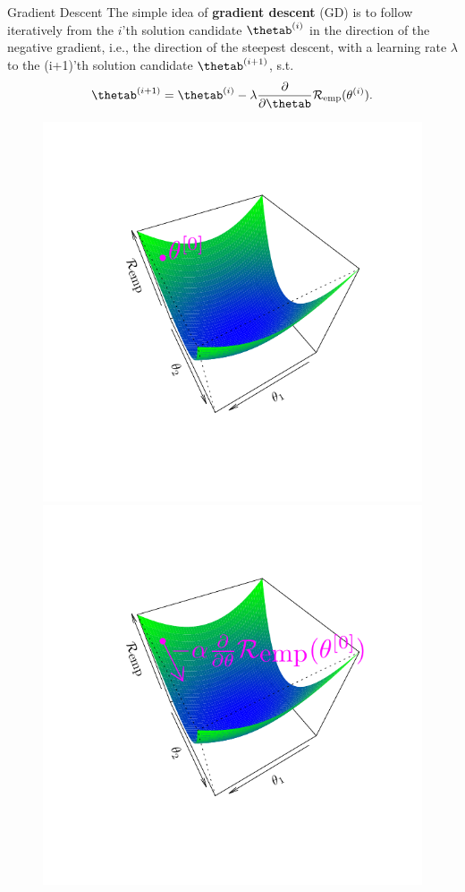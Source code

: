 \documentclass[11pt,compress,t,notes=noshow, xcolor=table]{beamer}
\begin{document}
\begin{vbframe}{Gradient Descent}
The simple idea of \textbf{gradient descent} (GD) is to follow iteratively from the $i$'th solution candidate $\thetab^{(i)}$ in the direction of the negative gradient, i.e., the direction of the steepest descent, with a learning rate $\lambda$ to the (i+1)'th solution candidate $\thetab^{(i+1)}$, s.t.
\[
\thetab^{(i+1)} = \thetab^{(i)} - \lambda \frac{\partial}{\partial\thetab}{\riske(\theta^{(i)})}.
\]

\begin{figure}[!htb]
  \includegraphics[trim=2cm 2cm 2cm 2cm, width=\linewidth]{figure/grad_desc1}  
\endminipage\hfill
{}
  \includegraphics[trim=2cm 2cm 2cm 2cm, width=\linewidth]{figure/grad_desc2}

\end{figure}
\end{vbframe}
\end{document}
